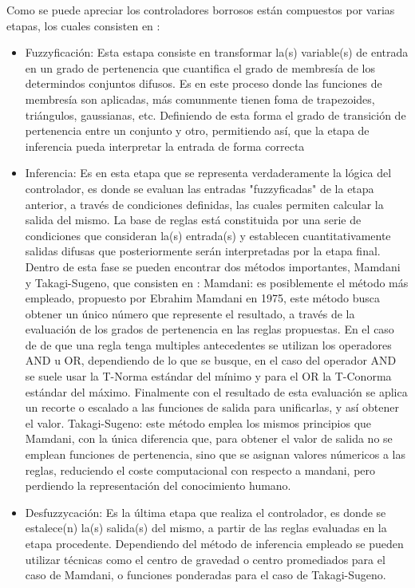 \par Como se puede apreciar los controladores borrosos están compuestos por varias etapas, los cuales consisten en \cite{fuzzy}:

\begin{itemize}
	\item Fuzzyficación: Esta estapa consiste en transformar la(s) variable(s) de entrada en un grado de pertenencia que cuantifica el grado de membresía de los determindos conjuntos difusos. Es en este proceso donde las funciones de membresía son aplicadas, más comunmente tienen foma de trapezoides, triángulos, gaussianas, etc. Definiendo de esta forma el grado de transición de pertenencia entre un conjunto y otro, permitiendo así, que la etapa de inferencia pueda interpretar la entrada de forma correcta 
	\item Inferencia: Es en esta etapa que se representa verdaderamente la lógica del controlador, es donde se evaluan las entradas "fuzzyficadas" de la etapa anterior, a través de condiciones definidas,  las cuales permiten calcular la salida del mismo. La base de reglas está constituida por una serie de condiciones que consideran la(s) entrada(s) y establecen cuantitativamente salidas difusas que posteriormente serán interpretadas por la etapa final. Dentro de esta fase se pueden encontrar dos métodos importantes, Mamdani y Takagi-Sugeno, que consisten en \cite{jang1996input}:
	\subitem Mamdani: es posiblemente el método más empleado, propuesto por Ebrahim Mamdani en 1975, este método busca obtener un único número que represente el resultado, a través de la evaluación de los grados de pertenencia en las reglas propuestas. En el caso de de que una regla tenga multiples antecedentes se utilizan los operadores AND u OR, dependiendo de lo que se busque, en el caso del operador AND se suele usar la T-Norma estándar del mínimo y para el OR la T-Conorma estándar del máximo. Finalmente con el resultado de esta evaluación se aplica un recorte o escalado a las funciones de salida para unificarlas, y así obtener el valor.
	\subitem Takagi-Sugeno: este método emplea los mismos principios que Mamdani, con la única diferencia que, para obtener el valor de salida no se emplean funciones de pertenencia, sino que se asignan valores númericos a las reglas, reduciendo el coste computacional con respecto a mandani, pero perdiendo la representación del conocimiento humano.     
	\item Desfuzzycación: Es la última etapa que realiza el controlador, es donde se estalece(n) la(s) salida(s) del mismo, a partir de las reglas evaluadas en la etapa procedente. Dependiendo del método de inferencia empleado se pueden utilizar técnicas como el centro de gravedad o centro promediados para el caso de Mamdani, o funciones ponderadas para el caso de Takagi-Sugeno.    
\end{itemize}



